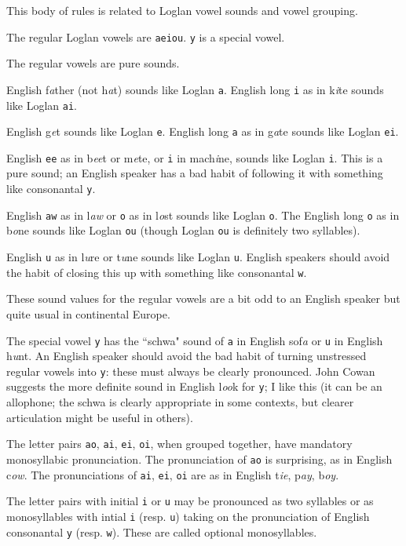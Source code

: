 \documentclass[12pt]{article}
\begin{document}
This body of rules is related to Loglan vowel sounds and vowel grouping.

The regular Loglan vowels are {\tt aeiou}.  {\tt y} is a special vowel.

The regular vowels are pure sounds.  

English f{\em a}ther (not h{\em a}t) sounds like Loglan {\tt a}.  English long {\tt i}
as in k{\em i}te sounds like Loglan {\tt ai}.

English g{\em e}t sounds like Loglan {\tt e}.  English long {\tt a} as in g{\em a}te sounds like
Loglan {\tt ei}.

English {\tt ee} as in b{\em ee}t or m{\em e}te, or {\tt i} in mach{\em i}ne, sounds like Loglan {\tt i}.  This is a pure sound;
an English speaker has a bad habit of following it with something like consonantal {\tt y}.

English {\tt aw} as in l{\em aw} or {\tt o} as in l{\em o}st sounds like Loglan {\tt o}.  The English long {\tt o}
as in b{\em o}ne sounds like Loglan {\tt ou} (though Loglan {\tt ou} is definitely two syllables).

English {\tt u} as in l{\em u}re or t{\em u}ne sounds like Loglan {\tt u}.  English speakers should avoid the habit of closing this up with something like consonantal {\tt w}.

These sound values for the regular vowels are a bit odd to an English speaker but quite usual in continental Europe.

The special vowel {\tt y} has the ``schwa" sound of {\tt a} in English sof{\em a} or {\tt u} in English
h{\em u}nt.  An English speaker should avoid the bad habit of turning unstressed regular vowels into {\tt y}:
these must always be clearly pronounced.  John Cowan suggests the more definite sound in English l{\em oo}k for
{\tt y}; I like this (it can be an allophone; the schwa is clearly appropriate in some contexts, but clearer articulation might be useful in others).

The letter pairs {\tt ao}, {\tt ai}, {\tt ei}, {\tt oi}, when grouped together, have mandatory monosyllabic pronunciation.  The pronunciation of {\tt ao} is surprising, as in English c{\em ow}.  The pronunciations
of {\tt ai}, {\tt ei}, {\tt oi} are as in English t{\em ie}, p{\em ay}, b{\em oy}.

The letter pairs with initial {\tt i} or {\tt u} may be pronounced as two syllables or as monosyllables
with intial {\tt i} (resp. {\tt u}) taking on the pronunciation of English consonantal {\tt y} (resp. {\tt w}).
These are called optional monosyllables.
\end{document}
